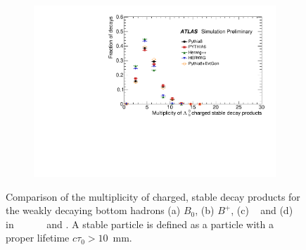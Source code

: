 \begin{figure}
\begin{subfigure}[]{0.45\textwidth}
\end{subfigure}
\begin{subfigure}[]{0.45\textwidth}
\includegraphics[width=\textwidth]{evtgen/figures/EvtGen/Lambdab0/h_species_ncharge.pdf}
\end{subfigure}
\caption{Comparison of the multiplicity of charged, stable decay products for the weakly decaying bottom hadrons 
(a) $B_0$, (b) $B^{+}$, (c) \Bs~ and (d) \Lb~
in \PythiaE\,~ \Pythia\,~ \newline \Herwigpp\, \Herwig\ and \EvtGen. A stable particle is defined
as a particle with a proper lifetime $c\tau_{0}>10$~mm. }
\label{fig:bcharge}
\end{figure}

